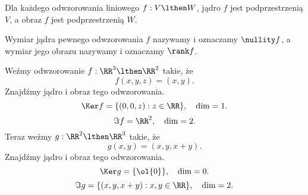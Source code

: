 \begin{fact}
    Dla każdego odwzorowania liniowego $f : V \lthen W$, jądro $f$ jest podprzestrzenią $V$, a obraz $f$ jest podprzestrzenią $W$.
\end{fact}

Wymiar jądra pewnego odwzorowania $f$ nazywamy  i oznaczamy $\nullity f$, a wymiar jego obrazu nazywamy  i oznaczamy $\rank f$.

\begin{example}
    Weźmy odwzorowanie $f : \RR^3 \lthen \RR^2$ takie, że
    \[ f(x, y, z) = (x, y). \]
    Znajdźmy jądro i obraz tego odwzorowania.
    \[ \Ker f = \{(0, 0, z) : z \in \RR\}, \quad \dim = 1. \]
    \[ \Im f = \RR^2, \quad \dim = 2. \]
    Teraz weźmy $g : \RR^2 \lthen \RR^3$ takie, że
    \[ g(x, y) = (x, y, x + y). \]
    Znajdźmy jądro i obraz tego odwzorowania.
    \[ \Ker g = \{\ol{0}\}, \quad \dim = 0. \]
    \[ \Im g = \{(x, y, x+y) : x, y \in \RR\}, \quad \dim = 2. \]
\end{example}

